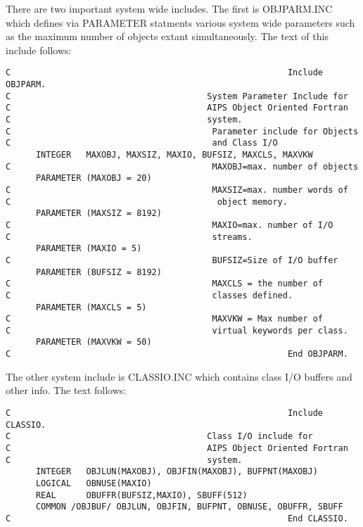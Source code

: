    There are two important system wide includes.  The first is
OBJPARM.INC which defines via PARAMETER statments various system wide
parameters such as the maximum number of objects extant
simultaneously.  The text of this include follows:
{\small\begin{verbatim}
C                                                       Include OBJPARM.
C                                       System Parameter Include for
C                                       AIPS Object Oriented Fortran
C                                       system.
C                                        Parameter include for Objects
C                                        and Class I/O
      INTEGER   MAXOBJ, MAXSIZ, MAXIO, BUFSIZ, MAXCLS, MAXVKW
C                                        MAXOBJ=max. number of objects
      PARAMETER (MAXOBJ = 20)
C                                        MAXSIZ=max. number words of
C                                         object memory.
      PARAMETER (MAXSIZ = 8192)
C                                        MAXIO=max. number of I/O
C                                        streams.
      PARAMETER (MAXIO = 5)
C                                        BUFSIZ=Size of I/O buffer
      PARAMETER (BUFSIZ = 8192)
C                                        MAXCLS = the number of
C                                        classes defined.
      PARAMETER (MAXCLS = 5)
C                                        MAXVKW = Max number of
C                                        virtual keywords per class.
      PARAMETER (MAXVKW = 50)
C                                                       End OBJPARM.
\end{verbatim}}


   The other system include is CLASSIO.INC which contains class I/O
buffers and other info. The text follows:
{\small\begin{verbatim}
C                                                       Include CLASSIO.
C                                       Class I/O include for
C                                       AIPS Object Oriented Fortran
C                                       system.
      INTEGER   OBJLUN(MAXOBJ), OBJFIN(MAXOBJ), BUFPNT(MAXOBJ)
      LOGICAL   OBNUSE(MAXIO)
      REAL      OBUFFR(BUFSIZ,MAXIO), SBUFF(512)
      COMMON /OBJBUF/ OBJLUN, OBJFIN, BUFPNT, OBNUSE, OBUFFR, SBUFF
C                                                       End CLASSIO.
\end{verbatim}}

